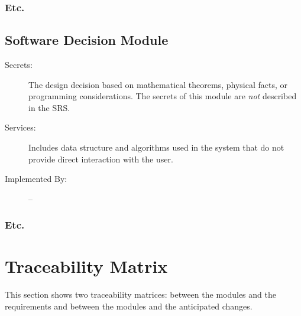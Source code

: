 \documentclass[12pt, titlepage]{article}
\begin{document}
\subsubsection{Etc.}

\subsection{Software Decision Module}

\begin{description}
\item[Secrets:] The design decision based on mathematical theorems, physical
  facts, or programming considerations. The secrets of this module are
  \emph{not} described in the SRS.
\item[Services:] Includes data structure and algorithms used in the system that
  do not provide direct interaction with the user. 
\item[Implemented By:] --
\end{description}

\subsubsection{Etc.}


\section{Traceability Matrix} \label{SecTM}

This section shows two traceability matrices: between the modules and the
requirements and between the modules and the anticipated changes.
\end{document}
